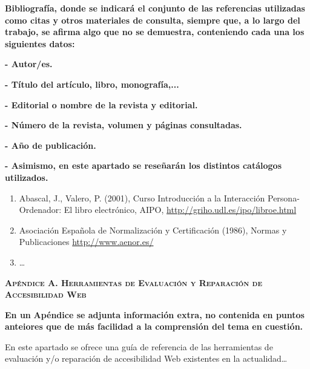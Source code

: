 \documentclass[a4paper]{article}
\newcommand\textstyleeacep[1]{#1}
\newcommand\liststyleWWviiiNumiii{%
\renewcommand\theenumi{\arabic{enumi}}
\renewcommand\theenumii{\alph{enumii}}
\renewcommand\theenumiii{\roman{enumiii}}
\renewcommand\theenumiv{\arabic{enumiv}}
\renewcommand\labelenumi{[\theenumi]}
\renewcommand\labelenumii{\theenumii.}
\renewcommand\labelenumiii{\theenumiii.}
\renewcommand\labelenumiv{\theenumiv.}
}
\begin{document}
\bigskip


\bigskip


\bigskip

{
{\textbf{B}}{\textbf{ibliografía}}{\textbf{, donde se indicará el conjunto de las referencias utilizadas como citas y otros materiales de consulta, siempre que, a lo largo del trabajo, se afirma algo que no se demuestra, conteniendo cada una los siguientes datos:}}}

{\bfseries
{}- Autor/es.}

{\bfseries
{}- Título del artículo, libro, monografía,...}

{\bfseries
{}- Editorial o nombre de la revista y editorial.}

{\bfseries
{}- Número de la revista, volumen y páginas consultadas.}

{\bfseries
{}- Año de publicación.}

{\bfseries
{}- Asimismo, en este apartado se reseñarán los distintos catálogos utilizados.}


\bigskip


\bigskip

\liststyleWWviiiNumiii
\begin{enumerate}
\item {
{Abascal, J., Valero, P. (2001), Curso Introducción a la Interacción Persona-Ordenador: El libro electrónico, AIPO, }\url{http://griho.udl.es/ipo/libroe.html}}
\item {
{Asociación Española de Normalización y Certificación (1986), Normas y Publicaciones }\url{http://www.aenor.es/}{ \ }}
\item {
…}
\end{enumerate}
\clearpage\setcounter{page}{1}\pagestyle{Convertirxiv}
{\raggedleft\bfseries\scshape
Apéndice A. Herramientas de Evaluación y Reparación de Accesibilidad Web
\par}

\clearpage
\bigskip

\clearpage\setcounter{page}{1}\pagestyle{Convertirxv}

\bigskip


\bigskip


\bigskip

{
\textstyleeacep{{\textbf{En un }}}\textstyleeacep{{\textbf{Apéndice s}}}{\textbf{e adjunta información extra, no contenida en puntos anteiores que de más facilidad a la comprensión del tema en cuestión.}}}


\bigskip

{
En este apartado se ofrece una guía de referencia de las herramientas de evaluación y/o reparación de accesibilidad Web existentes en la actualidad…}
\end{document}
